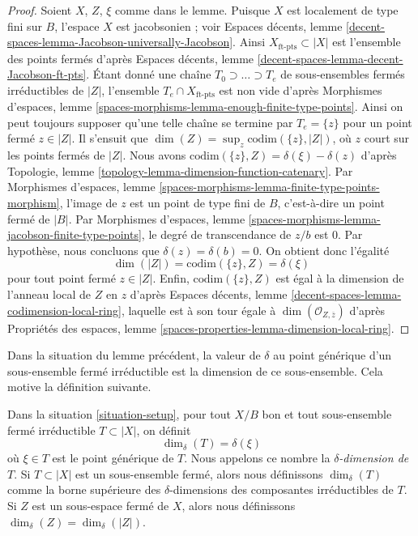 \begin{proof}
Soient $X$, $Z$, $\xi$ comme dans le lemme. Puisque $X$ est localement de type
fini sur $B$, l'espace $X$ est jacobsonien ; voir Espaces décents, lemme
\ref{decent-spaces-lemma-Jacobson-universally-Jacobson}. Ainsi
$X_{\text{ft-pts}} \subset |X|$ est l'ensemble des points fermés d'après
Espaces décents, lemme \ref{decent-spaces-lemma-decent-Jacobson-ft-pts}. Étant donné
une chaîne $T_0 \supset \ldots \supset T_e$ de sous-ensembles fermés
irréductibles de $|Z|$, l'ensemble $T_e \cap X_{\text{ft-pts}}$ est non vide
d'après Morphismes d'espaces, lemme
\ref{spaces-morphisms-lemma-enough-finite-type-points}. Ainsi on peut toujours
supposer qu'une telle chaîne se termine par $T_e = \{z\}$ pour un point fermé
$z \in |Z|$. Il s'ensuit que $\dim(Z) = \sup_z \text{codim}(\{z\}, |Z|)$, où
$z$ court sur les points fermés de $|Z|$. Nous avons $\text{codim}(\{z\}, Z) =
\delta(\xi) - \delta(z)$ d'après Topologie, lemme
\ref{topology-lemma-dimension-function-catenary}. Par Morphismes d'espaces,
lemme \ref{spaces-morphisms-lemma-finite-type-points-morphism}, l'image de $z$
est un point de type fini de $B$, c'est-à-dire un point fermé de $|B|$. Par
Morphismes d'espaces, lemme
\ref{spaces-morphisms-lemma-jacobson-finite-type-points}, le degré de
transcendance de $z/b$ est $0$. Par hypothèse, nous concluons que
$\delta(z) = \delta(b) = 0$. On obtient donc l'égalité
$$
\dim(|Z|) = \text{codim}(\{z\}, Z) = \delta(\xi)
$$
pour tout point fermé $z \in |Z|$. Enfin, $\text{codim}(\{z\}, Z)$ est égal à
la dimension de l'anneau local de $Z$ en $z$ d'après Espaces décents, lemme
\ref{decent-spaces-lemma-codimension-local-ring}, laquelle est à son tour égale
à $\dim(\mathcal{O}_{Z, \overline{z}})$ d'après Propriétés des espaces, lemme
\ref{spaces-properties-lemma-dimension-local-ring}.
\end{proof}

\noindent
Dans la situation du lemme précédent, la valeur de $\delta$ au point
générique d'un sous-ensemble fermé irréductible est la dimension de ce
sous-ensemble. Cela motive la définition suivante.

\begin{definition}
\label{definition-delta-dimension}
Dans la situation \ref{situation-setup}, pour tout $X/B$ bon et tout
sous-ensemble fermé irréductible $T \subset |X|$, on définit
$$
\dim_\delta(T) = \delta(\xi)
$$
où $\xi \in T$ est le point générique de $T$. Nous appelons ce nombre la {\it
$\delta$-dimension de $T$}. Si $T \subset |X|$ est un sous-ensemble fermé,
alors nous définissons $\dim_\delta(T)$ comme la borne supérieure des
$\delta$-dimensions des composantes irréductibles de $T$. Si $Z$ est un sous-espace fermé
de $X$, alors nous définissons $\dim_\delta(Z) = \dim_\delta(|Z|)$.
\end{definition}

